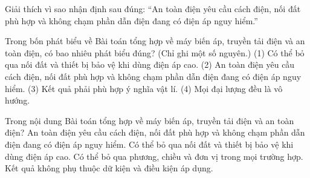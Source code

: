 \begin{bt}
Giải thích vì sao nhận định sau đúng: “An toàn điện yêu cầu cách điện, nối đất phù hợp và không chạm phần dẫn điện đang có điện áp nguy hiểm.”
\end{bt}

\begin{ex}
Trong bốn phát biểu về Bài toán tổng hợp về máy biến áp, truyền tải điện và an toàn điện, có bao nhiêu phát biểu đúng? (Chỉ ghi một số nguyên.) (1) Có thể bỏ qua nối đất và thiết bị bảo vệ khi dùng điện áp cao. (2) An toàn điện yêu cầu cách điện, nối đất phù hợp và không chạm phần dẫn điện đang có điện áp nguy hiểm. (3) Kết quả phải phù hợp ý nghĩa vật lí. (4) Mọi đại lượng đều là vô hướng.
\end{ex}

\begin{ex}
Trong nội dung Bài toán tổng hợp về máy biến áp, truyền tải điện và an toàn điện?
\choice
{\True An toàn điện yêu cầu cách điện, nối đất phù hợp và không chạm phần dẫn điện đang có điện áp nguy hiểm.}
{Có thể bỏ qua nối đất và thiết bị bảo vệ khi dùng điện áp cao.}
{Có thể bỏ qua phương, chiều và đơn vị trong mọi trường hợp.}
{Kết quả không phụ thuộc dữ kiện và điều kiện áp dụng.}
\end{ex}

